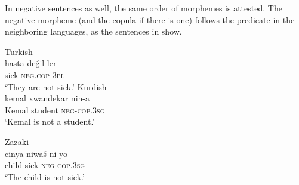 \documentclass[output=paper]{langsci/langscibook}
\begin{document}
			
			
			
			
			
			
			
			
			
			
			

\noindent In negative sentences as well, the same order of morphemes is attested. The negative morpheme (and the copula if there is one) follows the predicate in the neighboring languages, as the sentences in  show.


\begin{exe}
\ex \label{copneg} 
		\begin{xlist}
		\ex Turkish \\\label{copnegtk}\gll hasta 	değil-ler		\\
    sick	\textsc{neg.cop-3pl} \\
       \glt `They are not sick.'
	\ex Kurdish \\\label{copnegkr}  \gll kemal	xwandekar  	nin-a	 \\
    Kemal	student		\textsc{neg-cop.3sg}\\
    \glt    `Kemal is not a student.'
    
        
		\ex Zazaki \\ \label{copnegza} \gll  cinya 	niwaš   ni-yo\\
        child	sick	\textsc{neg-cop.3sg} \\
        \glt `The child is not sick.'
        \end{xlist}
      
\end{exe}
\end{document}
